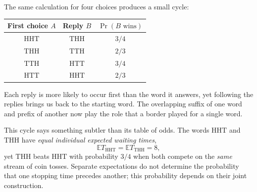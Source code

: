 The same calculation for four choices produces a small cycle:
\begin{center}
\begin{tabular}{@{}ccc@{}}
\toprule
First choice \(A\)&Reply \(B\)&\(\Pr(B\text{ wins})\)\\
\midrule
\(\mathrm{HHT}\)&\(\mathrm{THH}\)&\(3/4\)\\
\(\mathrm{THH}\)&\(\mathrm{TTH}\)&\(2/3\)\\
\(\mathrm{TTH}\)&\(\mathrm{HTT}\)&\(3/4\)\\
\(\mathrm{HTT}\)&\(\mathrm{HHT}\)&\(2/3\)\\
\bottomrule
\end{tabular}
\end{center}
Each reply is more likely to occur first than the word it answers, yet following the replies brings us back to the starting word. The overlapping suffix of one word and prefix of another now play the role that a border played for a single word.

This cycle says something subtler than its table of odds. The words \(\mathrm{HHT}\) and \(\mathrm{THH}\) have \emph{equal individual expected waiting times},
\[
 \mathbb ET_{\mathrm{HHT}}=\mathbb ET_{\mathrm{THH}}=8,
\]
yet \(\mathrm{THH}\) beats \(\mathrm{HHT}\) with probability \(3/4\) when both compete on the \emph{same} stream of coin tosses. Separate expectations do not determine the probability that one stopping time precedes another; this probability depends on their joint construction.

